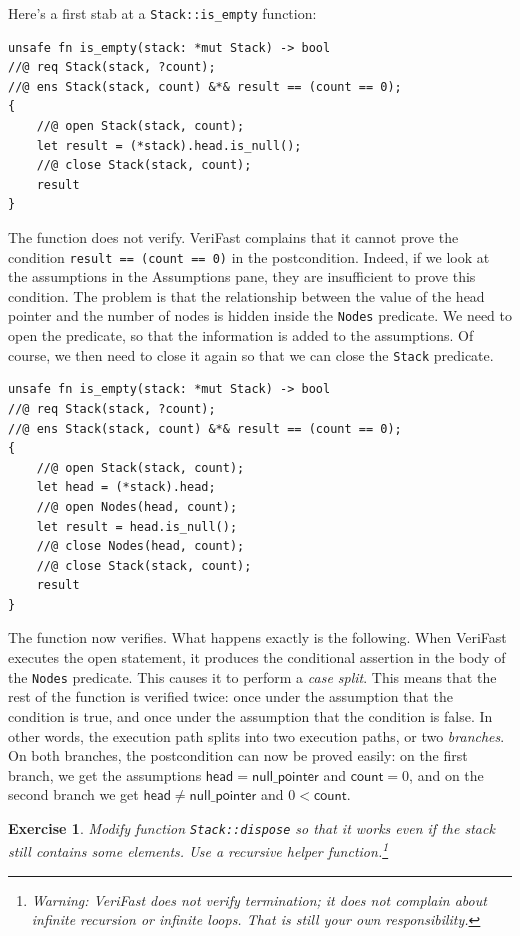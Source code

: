\documentclass{article}
\newtheorem{exercise}{Exercise}
\begin{document}
Here's a first stab at a \lstinline!Stack::is_empty! function:
\begin{lstlisting}
unsafe fn is_empty(stack: *mut Stack) -> bool
//@ req Stack(stack, ?count);
//@ ens Stack(stack, count) &*& result == (count == 0);
{
    //@ open Stack(stack, count);
    let result = (*stack).head.is_null();
    //@ close Stack(stack, count);
    result
}
\end{lstlisting}
The function does not verify. VeriFast complains that it cannot
prove the condition \lstinline!result == (count == 0)! in the
postcondition. Indeed, if we look at the assumptions in the
Assumptions pane, they are insufficient to prove this
condition. The problem is that the relationship between the
value of the head pointer and the number of nodes is hidden
inside the \lstinline!Nodes! predicate. We need to open the
predicate, so that the information is added to the assumptions.
Of course, we then need to close it again so that we can close
the \lstinline!Stack! predicate.
\begin{lstlisting}
unsafe fn is_empty(stack: *mut Stack) -> bool
//@ req Stack(stack, ?count);
//@ ens Stack(stack, count) &*& result == (count == 0);
{
    //@ open Stack(stack, count);
    let head = (*stack).head;
    //@ open Nodes(head, count);
    let result = head.is_null();
    //@ close Nodes(head, count);
    //@ close Stack(stack, count);
    result
}
\end{lstlisting}
The function now verifies. What happens exactly is the
following. When VeriFast executes the open statement, it
produces the conditional assertion in the body of the
\lstinline!Nodes! predicate. This causes it to perform a
\emph{case split}. This means that the rest of the function is
verified twice: once under the assumption that the condition is
true, and once under the assumption that the condition is
false. In other words, the execution path splits into two
execution paths, or two \emph{branches}. On both branches, the
postcondition can now be proved easily: on the first branch, we
get the assumptions $\mathsf{head} = \mathsf{null\_pointer}$ and %
$\mathsf{count} = 0$, and on the second branch we get
$\mathsf{head} \neq \mathsf{null\_pointer}$ and $0 < \mathsf{count}$.

\begin{exercise}\label{exercise:dispose}
Modify function \lstinline!Stack::dispose! so that it works even
if the stack still contains some elements. Use a recursive
helper function.\footnote{Warning: VeriFast does not verify
termination; it does not complain about infinite recursion or
infinite loops. That is still your own responsibility.}
\end{exercise}
\end{document}
